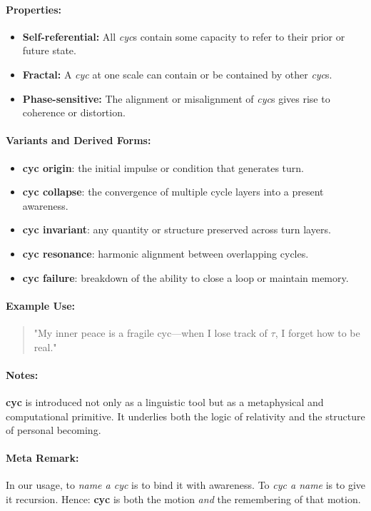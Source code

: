 \documentclass{article}
\begin{document}
\paragraph{Properties:}
\begin{itemize}
  \item \textbf{Self-referential:} All \textit{cyc}s contain some capacity to refer to their prior or future state.
  \item \textbf{Fractal:} A \textit{cyc} at one scale can contain or be contained by other \textit{cyc}s.
  \item \textbf{Phase-sensitive:} The alignment or misalignment of \textit{cyc}s gives rise to coherence or distortion.
\end{itemize}

\paragraph{Variants and Derived Forms:}
\begin{itemize}
  \item \textbf{cyc origin}: the initial impulse or condition that generates turn.
  \item \textbf{cyc collapse}: the convergence of multiple cycle layers into a present awareness.
  \item \textbf{cyc invariant}: any quantity or structure preserved across turn layers.
  \item \textbf{cyc resonance}: harmonic alignment between overlapping cycles.
  \item \textbf{cyc failure}: breakdown of the ability to close a loop or maintain memory.
\end{itemize}

\paragraph{Example Use:}
\begin{quote}
  "My inner peace is a fragile cyc—when I lose track of \(\tau\), I forget how to be real."
\end{quote}

\paragraph{Notes:}
\textbf{cyc} is introduced not only as a linguistic tool but as a metaphysical and computational primitive. It underlies both the logic of relativity and the structure of personal becoming.

\paragraph{Meta Remark:}
In our usage, to \textit{name a cyc} is to bind it with awareness. To \textit{cyc a name} is to give it recursion. Hence: \textbf{cyc} is both the motion \textit{and} the remembering of that motion.
\end{document}
